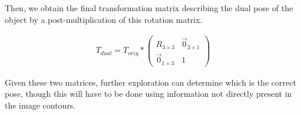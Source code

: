 Then, we obtain the final transformation matrix describing the dual pose of the object by a post-multiplication of this rotation matrix.

\begin{equation}
    \begin{aligned}
        T_{dual} = T_{orig} * \begin{pmatrix}
            R_{3 \times 3} & \vec{0}_{3 \times 1} \\ \vec{0}_{1 \times 3} & 1
        \end{pmatrix}
    \end{aligned}
    \label{eq:rotation-matrix-mult}
\end{equation}

Given these two matrices, further exploration can determine which is the correct pose, though this will have to be done using information not directly present in the image contours.